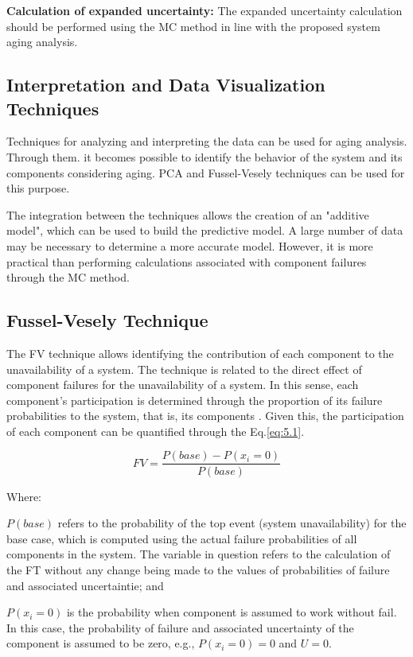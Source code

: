 \documentclass{ws-m3as}
\begin{document}
\begin{romanlist}[(ii)]
\item \textbf{Calculation of expanded uncertainty:} The expanded uncertainty calculation should be performed using the MC method in line with the proposed system aging analysis.

\end{romanlist}

\subsection{Interpretation and Data Visualization Techniques}
Techniques for analyzing and interpreting the data can be used for aging analysis. Through them. it becomes possible to identify the behavior of the system and its components considering aging. PCA and Fussel-Vesely techniques can be used for this purpose. 

The integration between the techniques allows the creation of an "additive model", which can be used to build the predictive model. A large number of data may be necessary to determine a more accurate model. However, it is more practical than performing calculations associated with component failures through the MC method.

\subsection{Fussel-Vesely Technique} 

The FV technique allows identifying the contribution of each component to the unavailability of a system. The technique is related to the direct effect of component failures for the unavailability of a system. In this sense, each component's participation is determined through the proportion of its failure probabilities to the system, that is, its components \cite{Shadiah2019}. Given this, the participation of each component can be quantified through the Eq.\ref{eq:5.1}.

\begin{equation} \label{eq:5.1}
FV=\frac{P(base)-P(x_{i}=0)}{P(base)}
\end{equation}

Where:

\begin{itemlist}
	\item $P(base)$ refers to the probability of the top event (system unavailability) for the base case, which is computed using the actual failure probabilities of all components in the system. The variable in question refers to the calculation of the FT without any change being made to the values of probabilities of failure and associated uncertaintie; and
	\item $P(x_{i}=0)$ is the probability when component is assumed to work without fail. In this case, the probability of failure and associated uncertainty of the component is assumed to be zero, e.g., $P(x_{i}=0)=0$ and $U=0$.
\end{itemlist}
\end{document}
